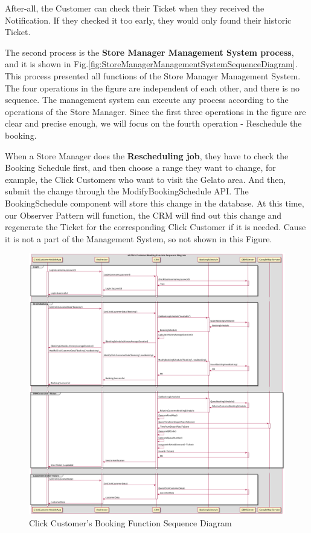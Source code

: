 \documentclass[a4paper,12pt]{report}
\begin{document}
After-all, the Customer can check their Ticket when they received the Notification.
If they checked it too early, they would only found their historic Ticket.


The second process is the \textbf{Store Manager Management System process}, and it is shown in Fig.\ref{fig:StoreManagerManagementSystemSequenceDiagram}.
This process presented all functions of the Store Manager Management System.
The four operations in the figure are independent of each other, and there is no sequence.
The management system can execute any process according to the operations of the Store Manager.
Since the first three operations in the figure are clear and precise enough, we will focus on the fourth operation - Reschedule the booking.

When a Store Manager does the \textbf{Rescheduling job}, they have to check the Booking Schedule first, and then choose a range they want to change,
for example, the Click Customers who want to visit the Gelato area.
And then, submit the change through the ModifyBookingSchedule API.
The BookingSchedule component will store this change in the database.
At this time, our Observer Pattern will function, the CRM will find out this change and regenerate the Ticket for the corresponding Click Customer if it is needed.
Cause it is not a part of the Management System, so not shown in this Figure.

\begin{figure}[H]
	\includegraphics[width=1.2\textwidth]{sequence_diagram_ClickCustomerBookingFunction}
	\centering
	\caption{Click Customer's Booking Function Sequence Diagram}
	\label{fig:ClickCustomerBookingFunction}
\end{figure}
\end{document}
